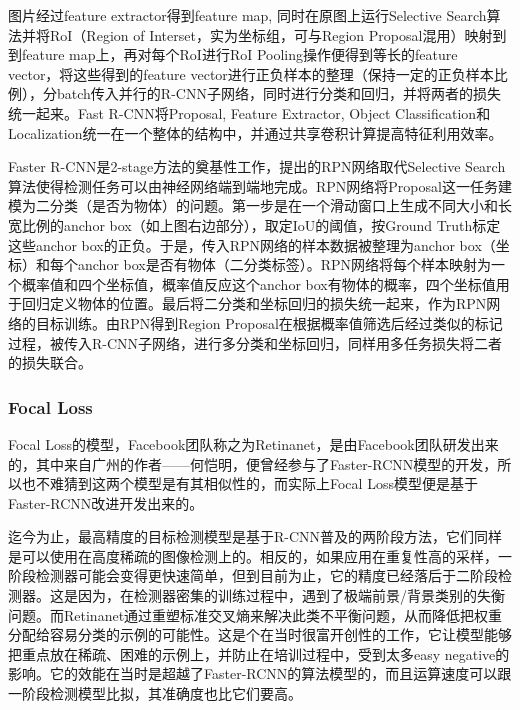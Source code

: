\documentclass[journal,transmag]{IEEEtran}
\begin{document}
图片经过feature extractor得到feature map, 同时在原图上运行Selective Search算法并将RoI（Region of Interset，实为坐标组，可与Region Proposal混用）映射到到feature map上，再对每个RoI进行RoI Pooling操作便得到等长的feature vector，将这些得到的feature vector进行正负样本的整理（保持一定的正负样本比例），分batch传入并行的R-CNN子网络，同时进行分类和回归，并将两者的损失统一起来。Fast R-CNN将Proposal, Feature Extractor, Object Classification和Localization统一在一个整体的结构中，并通过共享卷积计算提高特征利用效率。

Faster R-CNN是2-stage方法的奠基性工作，提出的RPN网络取代Selective Search算法使得检测任务可以由神经网络端到端地完成。RPN网络将Proposal这一任务建模为二分类（是否为物体）的问题。第一步是在一个滑动窗口上生成不同大小和长宽比例的anchor box（如上图右边部分），取定IoU的阈值，按Ground Truth标定这些anchor box的正负。于是，传入RPN网络的样本数据被整理为anchor box（坐标）和每个anchor box是否有物体（二分类标签）。RPN网络将每个样本映射为一个概率值和四个坐标值，概率值反应这个anchor box有物体的概率，四个坐标值用于回归定义物体的位置。最后将二分类和坐标回归的损失统一起来，作为RPN网络的目标训练。由RPN得到Region Proposal在根据概率值筛选后经过类似的标记过程，被传入R-CNN子网络，进行多分类和坐标回归，同样用多任务损失将二者的损失联合。
\subsubsection{Focal Loss}
Focal Loss的模型，Facebook团队称之为Retinanet，是由Facebook团队研发出来的，其中来自广州的作者——何恺明，便曾经参与了Faster-RCNN模型的开发，所以也不难猜到这两个模型是有其相似性的，而实际上Focal Loss模型便是基于Faster-RCNN改进开发出来的。

迄今为止，最高精度的目标检测模型是基于R-CNN普及的两阶段方法，它们同样是可以使用在高度稀疏的图像检测上的。相反的，如果应用在重复性高的采样，一阶段检测器可能会变得更快速简单，但到目前为止，它的精度已经落后于二阶段检测器。这是因为，在检测器密集的训练过程中，遇到了极端前景/背景类别的失衡问题。而Retinanet通过重塑标准交叉熵来解决此类不平衡问题，从而降低把权重分配给容易分类的示例的可能性。这是个在当时很富开创性的工作，它让模型能够把重点放在稀疏、困难的示例上，并防止在培训过程中，受到太多easy negative的影响。它的效能在当时是超越了Faster-RCNN的算法模型的，而且运算速度可以跟一阶段检测模型比拟，其准确度也比它们要高。
\end{document}
